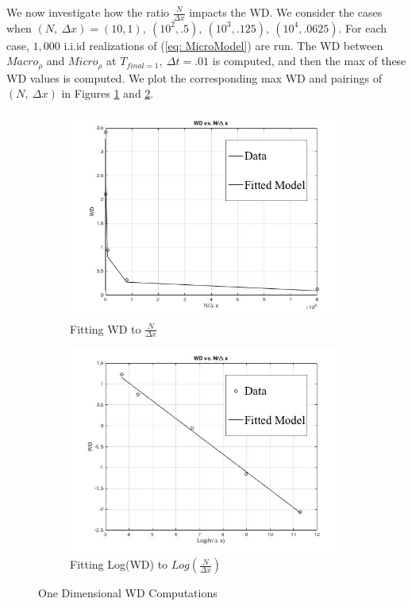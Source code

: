 \documentclass[10pt]{article}
\begin{document}
We now investigate how the ratio $\frac{N}{\Delta x}$ impacts the WD. We consider the cases when $(N, \ \Delta x) = (10, 1), \ (10^2, .5), \ (10^3, .125), \ (10^4, .0625).$ For each case, $1,000$ i.i.id realizations of (\ref{eq: MicroModel}) are run. The WD between $Macro_{\rho}$ and $Micro_{\rho}$ at $T_{final = 1},\ \Delta t = .01$ is computed, and then the max of these WD values is computed. We plot the corresponding max WD and pairings of $(N, \ \Delta x)$ in Figures \ref{fig: FittingWDNDX} and \ref{fig: FittingLogWDNDX}.

\begin{figure}
\centering
\begin{subfigure}{.5\textwidth}
  \centering
  \includegraphics[width=.9\linewidth]{WDVSNDX.jpg}
  \caption{Fitting WD to $\frac{N}{\Delta x}$}
  \label{fig: FittingWDNDX}
\end{subfigure}%
\begin{subfigure}{.5\textwidth}
  \centering
  \includegraphics[width=.9\linewidth]{LogWDVSNDX.jpg}
  \caption{Fitting Log(WD) to $Log(\frac{N}{\Delta x})$}
  \label{fig: FittingLogWDNDX}
\end{subfigure}
\caption{One Dimensional WD Computations}
\label{fig:test}
\end{figure}
 
\end{document}
